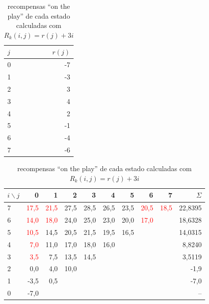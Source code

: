 \begin{table}[!h]
\parbox{.25\linewidth}{
\centering
\vspace{0.2cm}
\begin{tabular}{l|r}
$j$  & $r(j)$ \\ \hline
0 & -7  \\
1 & -3     \\
2 & 3      \\
3 & 4      \\
4 & 2     \\
5 & -1    \\
6 & -4     \\
7 & -6
\end{tabular}
\caption{recompensas-base para $j = 0, \ldots, 7$ ``on the play''}
\label{tab:rjplay}
}
\hfill
\parbox{.70\linewidth}{
\centering
\begin{tabular}{l|rrrrrrrr|r}
$i \backslash j$ & 0     & 1  & 2  & 3  & 4  & 5  & 6  & 7  & $\Sigma$ \\ \hline
7 & \textcolor{red}{17,5} & \textcolor{red}{21,5} & 27,5 & 28,5 & 26,5 & 23,5 & \textcolor{red}{20,5} & \textcolor{red}{18,5}  & 22,8395\\
6 & \textcolor{red}{14,0} & \textcolor{red}{18,0} & 24,0 & 25,0 & 23,0 & 20,0 & \textcolor{red}{17,0} &       & 18,6328\\
5 & \textcolor{red}{10,5} & 14,5 & 20,5 & 21,5 & 19,5 & 16,5 && & 14,0315 \\
4 & \textcolor{red}{7,0} & 11,0 & 17,0 & 18,0 & 16,0 &&&& 8,8240 \\
3 & \textcolor{red}{3,5} & 7,5 & 13,5 & 14,5 &&&& & 3,5119\\
2 & 0,0 & 4,0 & 10,0 &&&&&& -1,9 \\
1 & -3,5 & 0,5 &&&&& && -7,0\\
0 & -7,0 &&&& &&&& --
\end{tabular}
\caption{recompensas ``on the play'' de cada estado calculadas com $R_k(i,j) = r(j) + 3i$}
\label{tab:Rijplay}
}
\end{table}

